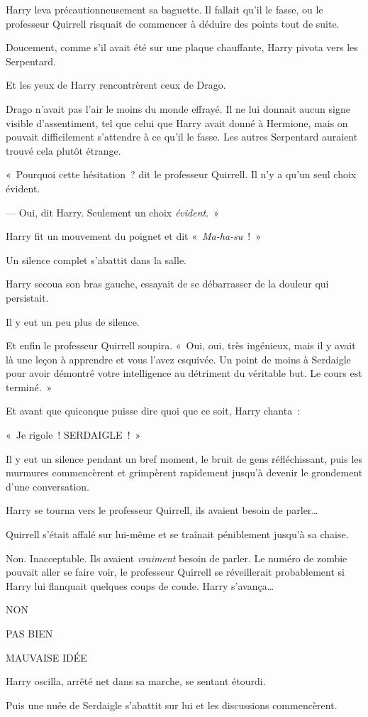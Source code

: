 Harry leva précautionneusement sa baguette. Il fallait qu'il le fasse, ou le professeur Quirrell risquait de commencer à déduire des points tout de suite.

Doucement, comme s'il avait été sur une plaque chauffante, Harry pivota vers les Serpentard.

Et les yeux de Harry rencontrèrent ceux de Drago.

Drago n'avait pas l'air le moins du monde effrayé. Il ne lui donnait aucun signe visible d'assentiment, tel que celui que Harry avait donné à Hermione, mais on pouvait difficilement s'attendre à ce qu'il le fasse. Les autres Serpentard auraient trouvé cela plutôt étrange.

«~Pourquoi cette hésitation~? dit le professeur Quirrell. Il n'y a qu'un seul choix évident.

--- Oui, dit Harry. Seulement un choix \emph{évident}.~»

Harry fit un mouvement du poignet et dit «~\emph{Ma-ha-su}~!~»

Un silence complet s'abattit dans la salle.

Harry secoua son bras gauche, essayait de se débarrasser de la douleur qui persistait.

Il y eut un peu plus de silence.

Et enfin le professeur Quirrell soupira. «~Oui, oui, très ingénieux, mais il y avait là une leçon à apprendre et vous l'avez esquivée. Un point de moins à Serdaigle pour avoir démontré votre intelligence au détriment du véritable but. Le cours est terminé.~»

Et avant que quiconque puisse dire quoi que ce soit, Harry chanta~:

«~Je rigole~! SERDAIGLE~!~»

Il y eut un silence pendant un bref moment, le bruit de gens réfléchissant, puis les murmures commencèrent et grimpèrent rapidement jusqu'à devenir le grondement d'une conversation.

Harry se tourna vers le professeur Quirrell, ils avaient besoin de parler…

Quirrell s'était affalé sur lui-même et se traînait péniblement jusqu'à sa chaise.

Non. Inacceptable. Ils avaient \emph{vraiment} besoin de parler. Le numéro de zombie pouvait aller se faire voir, le professeur Quirrell se réveillerait probablement si Harry lui flanquait quelques coups de coude. Harry s'avança…

NON

PAS BIEN

MAUVAISE IDÉE

Harry oscilla, arrêté net dans sa marche, se sentant étourdi.

Puis une nuée de Serdaigle s'abattit sur lui et les discussions commencèrent.~
